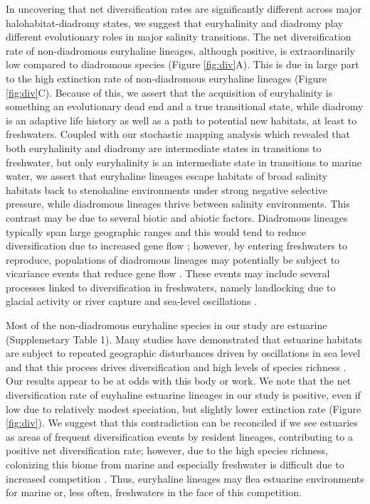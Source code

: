\documentclass[11pt]{article}
\begin{document}
In uncovering that net diversification rates are significantly different across major halohabitat-diadromy states, we suggest that euryhalinity and diadromy play different evolutionary roles in major salinity transitions. The net diversification rate of non-diadromous euryhaline lineages, although positive, is extraordinarily low compared to diadromous species (Figure \ref{fig:div}A). This is due in large part to the high extinction rate of non-diadromous euryhaline lineages (Figure \ref{fig:div}C).  Because of this, we assert that the acquisition of euryhalinity is something an evolutionary dead end and a true transitional state, while diadromy is an adaptive life history as well as a path to potential new habitats, at least to freshwaters. Coupled with our stochastic mapping analysis which revealed that both euryhalinity and diadromy are intermediate states in transitions to freshwater, but only euryhalinity is an intermediate state in transitions to marine water, we assert that euryhaline lineages escape habitats of broad salinity habitats back to stenohaline environments under strong negative selective pressure, while diadromous lineages thrive between salinity environments. This contrast may be due to several biotic and abiotic factors. Diadromous lineages typically span large geographic ranges and this would tend to reduce diversification due to increased gene flow \citep{palumbi1994genetic}; however, by entering freshwaters to reproduce, populations of diadromous lineages may potentially be subject to vicariance events that reduce gene flow \citep{mcdowall2001diadromy,seehausen2014speciation}. These events may include several processes linked to diversification in freshwaters, namely landlocking due to glacial activity \citep{bell1994introduction} or river capture and sea-level oscillations \citep{feutry2013evolution, albert2020diversification}. 


Most of the non-diadromous euryhaline species in our study are estuarine (Supplemetary Table 1). Many studies have demonstrated that estuarine habitats are subject to repeated geographic disturbances driven by oscillations in sea level \citep{shen2011plio,marko2010expansion} and that this process drives diversification and high levels of species richness \citep{bilton2002dispersal, wilson2006genetic}. Our results appear to be at odds with this body or work. We note that the net diversification rate of euyhaline estuarine lineages in our study is positive, even if low due to relatively modest speciation, but slightly lower extinction rate (Figure \ref{fig:div}). We suggest that this contradiction can be reconciled if we see estuaries as areas of frequent diversification events by resident lineages, contributing to a positive net diversification rate; however, due to the high species richness, colonizing this biome from marine and especially freshwater is difficult due to increased competition \citep{betancur2012apparent, fukami2007immigration, meyer2007effects, brockhurst2007niche,wiens2005niche}. Thus, euryhaline lineages may flea estuarine environments for marine or, less often, freshwaters in the face of this competition.
\end{document}
